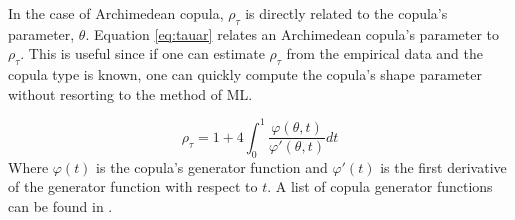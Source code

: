 In the case of Archimedean copula, $\rho_\tau$ is directly related to the copula's parameter, $\theta$.
Equation \ref{eq:tauar} relates an Archimedean copula's parameter to $\rho_\tau$.  This is useful since if one can estimate $\rho_\tau$ from the empirical data and the copula type is known, one can quickly compute the copula's shape parameter without resorting to the method of ML.

\begin{equation}
\rho_\tau = 1 + 4 \int_0^1 \frac{\varphi(\theta,t)}{\varphi'(\theta, t)}dt
\label{eq:tauar}
\end{equation}
Where $\varphi(t)$ is the copula's generator function and $\varphi'(t)$ is the first derivative of the generator function with respect to $t$. A list of copula generator functions can be found in \cite{Nelsen2006}. 





